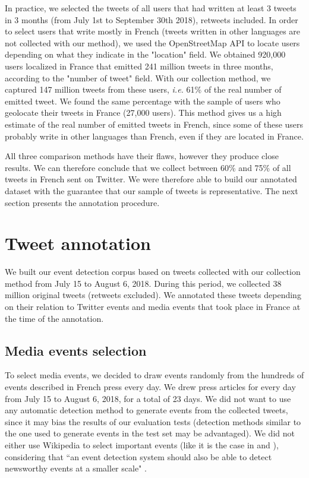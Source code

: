 In practice, we selected the tweets of all users that had written at least 3 tweets in 3 months (from July 1st to September 30th 2018), retweets included. In order to select users that write mostly in French (tweets written in other languages are not collected with our method), we used the OpenStreetMap API to locate users depending on what they indicate in the "location" field. We obtained 920,000 users localized in France that emitted 241 million tweets in three months, according to the "number of tweet" field. With our collection method, we captured 147 million tweets from these users, \textit{i.e.} 61\% of the real number of emitted tweet. We found the same percentage with the sample of users who geolocate their tweets in France (27,000 users). This method gives us a high estimate of the real number of emitted tweets in French, since some of these users probably write in other languages than French, even if they are located in France.

All three comparison methods have their flaws, however they produce close results. We can therefore conclude that we collect between 60\% and 75\% of all tweets in French sent on Twitter. We were therefore able to build our annotated dataset with the guarantee that our sample of tweets is representative. The next section presents the annotation procedure.

\section{Tweet annotation}

We built our event detection corpus based on tweets collected with our collection method from July 15 to August 6, 2018. During this period, we collected 38 million original tweets (retweets excluded). We annotated these tweets depending on their relation to  Twitter events and media events that took place in France at the time of the annotation.
	
	\subsection{Media events selection}
	To select media events, we decided to draw events randomly
from the hundreds of events described in French press every day. We drew press articles for every day from July 15 to August 6, 2018, for a total of 23 days. We did not want to use any automatic detection method to generate events from the collected tweets, since it may bias the results of our evaluation tests (detection methods similar to the one used to generate events in the test set may be advantaged). We did not either use Wikipedia to select important events (like it is the case in \citet{mcminn_building_2013} and \citet{petrovic_using_2012}), considering that ``an event detection system should also be able to detect newsworthy events at a smaller scale" \citep{hasan_survey_2018}. 


